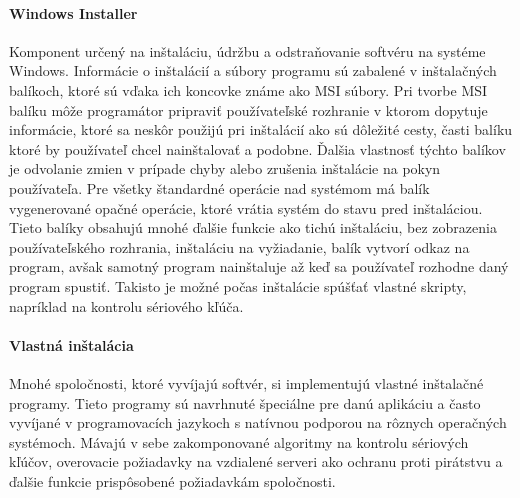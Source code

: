\paragraph{Windows Installer}
Komponent určený na inštaláciu, údržbu a odstraňovanie softvéru na systéme Windows. Informácie o inštalácií a súbory programu sú zabalené v inštalačných balíkoch, ktoré sú vďaka ich koncovke známe ako MSI súbory. Pri tvorbe MSI balíku môže programátor pripraviť používateľské rozhranie v ktorom dopytuje informácie, ktoré sa neskôr použijú pri inštalácií ako sú dôležité cesty, časti balíku ktoré by používateľ chcel nainštalovať a podobne. Ďalšia vlastnosť týchto balíkov je odvolanie zmien v prípade chyby alebo zrušenia inštalácie na pokyn používateľa. Pre všetky štandardné operácie nad systémom má balík vygenerované opačné operácie, ktoré vrátia systém do stavu pred inštaláciou. Tieto balíky obsahujú mnohé ďalšie funkcie ako tichú inštaláciu, bez zobrazenia používateľského rozhrania, inštaláciu na vyžiadanie, balík vytvorí odkaz na program, avšak samotný program nainštaluje až keď sa používateľ rozhodne daný program spustiť. Takisto je možné počas inštalácie spúšťať vlastné skripty, napríklad na kontrolu sériového kľúča. 

\paragraph{Vlastná inštalácia}
Mnohé spoločnosti, ktoré vyvíjajú softvér, si implementujú vlastné inštalačné programy. Tieto programy sú navrhnuté špeciálne pre danú aplikáciu a často vyvíjané v programovacích jazykoch s natívnou podporou na rôznych operačných systémoch. Mávajú v sebe zakomponované algoritmy na kontrolu sériových kľúčov, overovacie požiadavky na vzdialené serveri ako ochranu proti pirátstvu a ďalšie funkcie prispôsobené požiadavkám spoločnosti.

